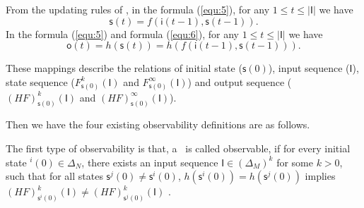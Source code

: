   
  
  From the updating rules of \BCNs, in the formula (\ref{equ:5}), for any $1\le t \le |\mathsf{I}|$ we have 
 \[\mathsf{s}(t)=f(\mathsf{i}(t-1),\mathsf{s}(t-1)).\] 
 In the formula (\ref{equ:5}) and formula (\ref{equ:6}), for any $1\le t \le |\mathsf{I}|$ we have  
 \[\mathsf{o}(t)=h(\mathsf{s}(t))=h(f(\mathsf{i}(t-1),\mathsf{s}(t-1))).\] 

These mappings describe the relations of initial state ($\mathsf{s}(0)$), input sequence ($\mathsf{I}$), state sequence ($F^k_{\mathsf{s}(0)}(\mathsf{I})$ and $F^{\infty}_{\mathsf{s}(0)}(\mathsf{I})$) and output sequence ($(HF)^k_{\mathsf{s}(0)}(\mathsf{I})$ and $(HF)^{\infty}_{\mathsf{s}(0)}(\mathsf{I})$). 

Then we have the four existing observability definitions are as follows.

\begin{definition} 
The first type of observability is that, a \BCN\ is called observable, if for every initial state \State$^{i}(0)$$\in \Delta_N$, there exists an input sequence $\mathsf{I}\in(\Delta_M)^k$ for some $k>0$, such that for all states $\mathsf{s}^{j}(0)\neq \mathsf{s}^{i}(0)$, $h(\mathsf{s}^{i}(0))=h(\mathsf{s}^{j}(0))$ implies $(HF)^k_{\mathsf{s}^{i}(0)}(\mathsf{I})\neq (HF)^k_{{\mathsf{s}^{j}(0)}}(\mathsf{I})$ \cite{cheng2009controllability}.
\end{definition}

